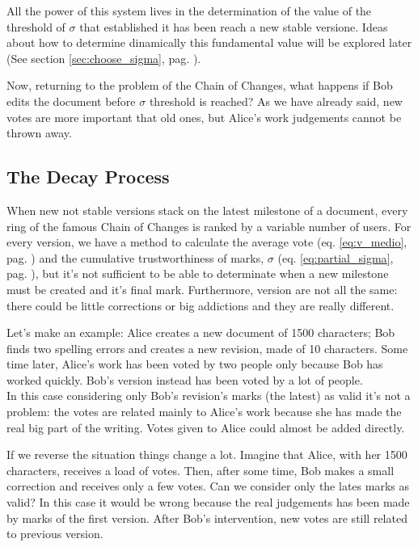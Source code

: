 \documentclass[a4paper,11pt]{article}
\newcommand{\sg}{$\sigma$ }
\begin{document}
All the power of this system lives in the determination of the value of the threshold of $
\sigma$ that established it has been reach a new stable versione. Ideas about how to 
determine dinamically this fundamental value will be explored later (See section \ref{sec:choose_sigma}, pag. \pageref{sec:choose_sigma}).

Now, returning to the problem of the Chain of Changes, what happens if Bob edits the 
document before $\sigma$ threshold is reached? As we have already said, new votes are 
more important that old ones, but Alice's work judgements cannot be thrown away.

\subsection{The Decay Process} \label{sec:decay}
When new not stable versions stack on the latest milestone of a document, every ring of 
the famous Chain of Changes is ranked by a variable number of users. For every version, we 
have a method to calculate the average vote (eq. \ref{eq:v_medio}, pag. 
\pageref{eq:v_medio}) and the cumulative trustworthiness of marks, \sg (eq. 
\ref{eq:partial_sigma}, pag. \pageref{eq:partial_sigma}), but it's not sufficient to be 
able to determinate when a new milestone must be created and it's final mark. Furthermore, 
version are not all  the same: there could be little corrections or big addictions and 
they are really different. 

Let's make an example: Alice creates a new document of 1500 characters; Bob finds two 
spelling errors and creates a new revision, made of 10 characters. Some time later, 
Alice's work has been voted by two people only because Bob has worked quickly. Bob's 
version instead has been voted by a lot of people. \\ In this case considering only Bob's 
revision's marks (the latest) as valid it's not a problem: the votes are related mainly to 
Alice's work because she has made the real big part of the writing.  Votes given to Alice 
could almost be added directly.

If we reverse the situation things change a lot. Imagine that Alice, with her 1500 
characters, receives a load of votes. Then, after some time, Bob makes a small correction 
and receives only a few votes. Can we consider only the lates marks as valid? In this case 
it would be wrong because the real judgements has been made by marks of the first 
version. After Bob's intervention, new votes are still related to previous version.
\end{document}
